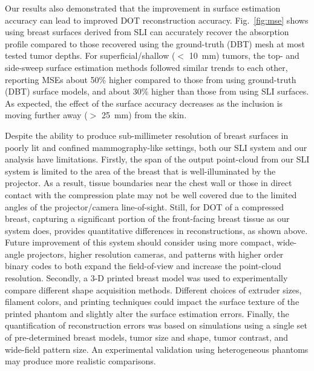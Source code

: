 Our results also demonstrated that the improvement in surface estimation accuracy can lead to improved \ac{DOT} reconstruction accuracy. Fig.~\ref{fig:mse} shows using breast surfaces derived from \ac{SLI} can accurately recover the absorption profile compared to those recovered using the ground-truth (\ac{DBT}) mesh at most tested tumor depths. For superficial/shallow ($<$ 10~mm) tumors, the top- and side-sweep surface estimation methods followed similar trends to each other, reporting \ac{MSE}s about 50\% higher compared to those from using ground-truth (\ac{DBT}) surface models, and about 30\% higher than those from using \ac{SLI} surfaces. As expected, the effect of the surface accuracy decreases as the inclusion is moving further away ($>$ 25~mm) from the skin.



Despite the ability to produce sub-millimeter resolution of breast surfaces in poorly lit and confined mammography-like settings, both our \ac{SLI} system and our analysis have limitations. Firstly, the span of the output point-cloud from our \ac{SLI} system is limited to the area of the breast that is well-illuminated by the projector. As a result, tissue boundaries near the chest wall or those in direct contact with the compression plate may not be well covered due to the limited angles of the projector/camera line-of-sight. Still, for \ac{DOT} of a compressed breast, capturing a significant portion of the front-facing breast tissue as our system does, provides quantitative differences in reconstructions, as shown above. Future improvement of this system should consider using more compact, wide-angle projectors, higher resolution cameras, and patterns with higher order binary codes to both expand the field-of-view and increase the point-cloud resolution. Secondly, a 3-D printed breast model was used to experimentally compare different shape acquisition methods. Different choices of extruder sizes, filament colors, and printing techniques could impact the surface texture of the printed phantom and slightly alter the surface estimation errors. Finally, the quantification of reconstruction errors was based on simulations using a single set of pre-determined breast models, tumor size and shape, tumor contrast, and wide-field pattern size. An experimental validation using heterogeneous phantoms may produce more realistic comparisons.


